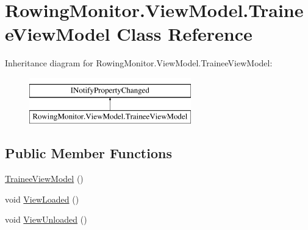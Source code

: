 \hypertarget{class_rowing_monitor_1_1_view_model_1_1_trainee_view_model}{}\section{Rowing\+Monitor.\+View\+Model.\+Trainee\+View\+Model Class Reference}
\label{class_rowing_monitor_1_1_view_model_1_1_trainee_view_model}
Inheritance diagram for Rowing\+Monitor.\+View\+Model.\+Trainee\+View\+Model\+:\begin{figure}[H]
\begin{center}
\leavevmode
\includegraphics[height=2.000000cm]{class_rowing_monitor_1_1_view_model_1_1_trainee_view_model}
\end{center}
\end{figure}
\subsection*{Public Member Functions}
\begin{DoxyCompactItemize}
\item 
\hyperlink{class_rowing_monitor_1_1_view_model_1_1_trainee_view_model_a97f8f56fd0414366f18cf93c041ac107}{Trainee\+View\+Model} ()
\item 
void \hyperlink{class_rowing_monitor_1_1_view_model_1_1_trainee_view_model_a9ca701305abf7846b36efd285d0acc71}{View\+Loaded} ()
\item 
void \hyperlink{class_rowing_monitor_1_1_view_model_1_1_trainee_view_model_a404af3ee49d67f777876beae5b4397c1}{View\+Unloaded} ()
\end{DoxyCompactItemize}
